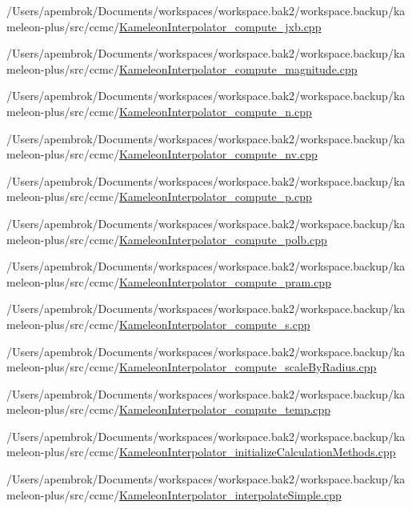 \begin{DoxyCompactItemize}
/\-Users/apembrok/\-Documents/workspaces/workspace.\-bak2/workspace.\-backup/kameleon-\/plus/src/ccmc/\hyperlink{_kameleon_interpolator__compute__jxb_8cpp}{Kameleon\-Interpolator\-\_\-compute\-\_\-jxb.\-cpp}\item 
/\-Users/apembrok/\-Documents/workspaces/workspace.\-bak2/workspace.\-backup/kameleon-\/plus/src/ccmc/\hyperlink{_kameleon_interpolator__compute__magnitude_8cpp}{Kameleon\-Interpolator\-\_\-compute\-\_\-magnitude.\-cpp}\item 
/\-Users/apembrok/\-Documents/workspaces/workspace.\-bak2/workspace.\-backup/kameleon-\/plus/src/ccmc/\hyperlink{_kameleon_interpolator__compute__n_8cpp}{Kameleon\-Interpolator\-\_\-compute\-\_\-n.\-cpp}\item 
/\-Users/apembrok/\-Documents/workspaces/workspace.\-bak2/workspace.\-backup/kameleon-\/plus/src/ccmc/\hyperlink{_kameleon_interpolator__compute__nv_8cpp}{Kameleon\-Interpolator\-\_\-compute\-\_\-nv.\-cpp}\item 
/\-Users/apembrok/\-Documents/workspaces/workspace.\-bak2/workspace.\-backup/kameleon-\/plus/src/ccmc/\hyperlink{_kameleon_interpolator__compute__p_8cpp}{Kameleon\-Interpolator\-\_\-compute\-\_\-p.\-cpp}\item 
/\-Users/apembrok/\-Documents/workspaces/workspace.\-bak2/workspace.\-backup/kameleon-\/plus/src/ccmc/\hyperlink{_kameleon_interpolator__compute__polb_8cpp}{Kameleon\-Interpolator\-\_\-compute\-\_\-polb.\-cpp}\item 
/\-Users/apembrok/\-Documents/workspaces/workspace.\-bak2/workspace.\-backup/kameleon-\/plus/src/ccmc/\hyperlink{_kameleon_interpolator__compute__pram_8cpp}{Kameleon\-Interpolator\-\_\-compute\-\_\-pram.\-cpp}\item 
/\-Users/apembrok/\-Documents/workspaces/workspace.\-bak2/workspace.\-backup/kameleon-\/plus/src/ccmc/\hyperlink{_kameleon_interpolator__compute__s_8cpp}{Kameleon\-Interpolator\-\_\-compute\-\_\-s.\-cpp}\item 
/\-Users/apembrok/\-Documents/workspaces/workspace.\-bak2/workspace.\-backup/kameleon-\/plus/src/ccmc/\hyperlink{_kameleon_interpolator__compute__scale_by_radius_8cpp}{Kameleon\-Interpolator\-\_\-compute\-\_\-scale\-By\-Radius.\-cpp}\item 
/\-Users/apembrok/\-Documents/workspaces/workspace.\-bak2/workspace.\-backup/kameleon-\/plus/src/ccmc/\hyperlink{_kameleon_interpolator__compute__temp_8cpp}{Kameleon\-Interpolator\-\_\-compute\-\_\-temp.\-cpp}\item 
/\-Users/apembrok/\-Documents/workspaces/workspace.\-bak2/workspace.\-backup/kameleon-\/plus/src/ccmc/\hyperlink{_kameleon_interpolator__initialize_calculation_methods_8cpp}{Kameleon\-Interpolator\-\_\-initialize\-Calculation\-Methods.\-cpp}\item 
/\-Users/apembrok/\-Documents/workspaces/workspace.\-bak2/workspace.\-backup/kameleon-\/plus/src/ccmc/\hyperlink{_kameleon_interpolator__interpolate_simple_8cpp}{Kameleon\-Interpolator\-\_\-interpolate\-Simple.\-cpp}\end{DoxyCompactItemize}
